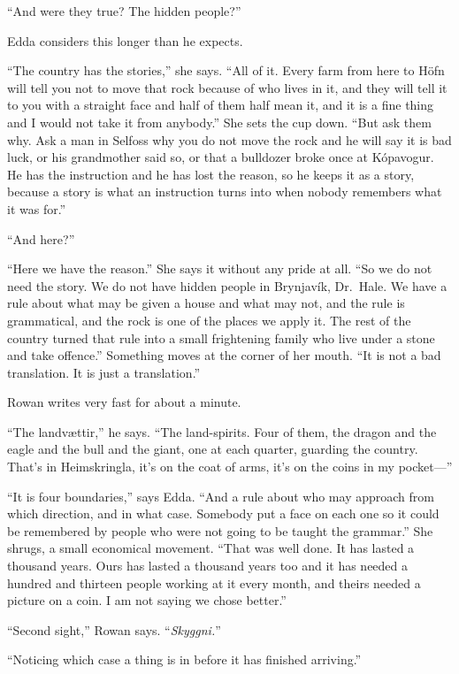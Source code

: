\documentclass[11pt,oneside]{book}
\begin{document}
``And were they true? The hidden people?''

Edda considers this longer than he expects.

``The country has the stories,'' she says. ``All of it. Every farm from
here to Höfn will tell you not to move that rock because of who lives in
it, and they will tell it to you with a straight face and half of them
half mean it, and it is a fine thing and I would not take it from
anybody.'' She sets the cup down. ``But ask them why. Ask a man in
Selfoss why you do not move the rock and he will say it is bad luck, or
his grandmother said so, or that a bulldozer broke once at Kópavogur.
He has the instruction and he has lost the reason, so he keeps it as a
story, because a story is what an instruction turns into when nobody
remembers what it was for.''

``And here?''

``Here we have the reason.'' She says it without any pride at all. ``So
we do not need the story. We do not have hidden people in Brynjavík,
Dr.~Hale. We have a rule about what may be given a house and what may
not, and the rule is grammatical, and the rock is one of the places we
apply it. The rest of the country turned that rule into a small
frightening family who live under a stone and take offence.'' Something
moves at the corner of her mouth. ``It is not a bad translation. It is
just a translation.''

Rowan writes very fast for about a minute.

``The landvættir,'' he says. ``The land-spirits. Four of them, the
dragon and the eagle and the bull and the giant, one at each quarter,
guarding the country. That's in Heimskringla, it's on the coat of arms,
it's on the coins in my pocket---''

``It is four boundaries,'' says Edda. ``And a rule about who may
approach from which direction, and in what case. Somebody put a face on
each one so it could be remembered by people who were not going to be
taught the grammar.'' She shrugs, a small economical movement. ``That
was well done. It has lasted a thousand years. Ours has lasted a
thousand years too and it has needed a hundred and thirteen people
working at it every month, and theirs needed a picture on a coin. I am
not saying we chose better.''

``Second sight,'' Rowan says. ``\emph{Skyggni.}''

``Noticing which case a thing is in before it has finished arriving.''
\end{document}
